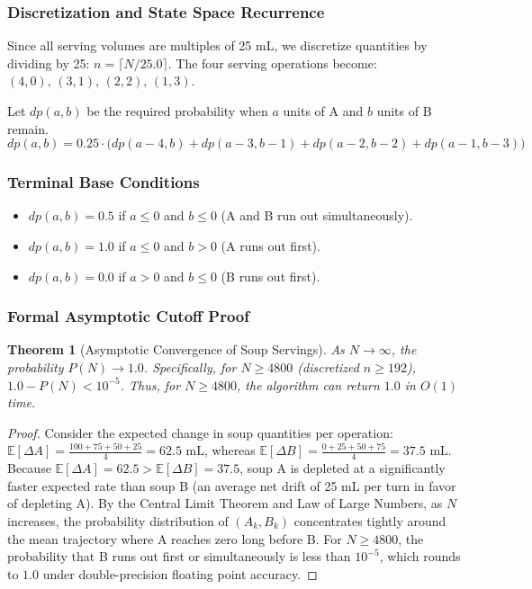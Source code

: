 \documentclass[10pt,journal,compsoc,onecolumn]{IEEEtran}
\newtheorem{theorem}{Theorem}
\begin{document}
\subsubsection{Discretization and State Space Recurrence}
Since all serving volumes are multiples of 25 mL, we discretize quantities by dividing by 25: $n = \lceil N / 25.0 \rceil$. The four serving operations become:
$(4, 0), \, (3, 1), \, (2, 2), \, (1, 3)$.

Let $dp(a, b)$ be the required probability when $a$ units of A and $b$ units of B remain.
\begin{equation}
dp(a, b) = 0.25 \cdot \Big( dp(a-4, b) + dp(a-3, b-1) + dp(a-2, b-2) + dp(a-1, b-3) \Big)
\label{eq:soup-rec}
\end{equation}

\subsubsection{Terminal Base Conditions}
\begin{itemize}
    \item $dp(a, b) = 0.5$ if $a \le 0$ and $b \le 0$ (A and B run out simultaneously).
    \item $dp(a, b) = 1.0$ if $a \le 0$ and $b > 0$ (A runs out first).
    \item $dp(a, b) = 0.0$ if $a > 0$ and $b \le 0$ (B runs out first).
\end{itemize}

\subsubsection{Formal Asymptotic Cutoff Proof}

\begin{theorem}[Asymptotic Convergence of Soup Servings]
As $N \rightarrow \infty$, the probability $P(N) \rightarrow 1.0$. Specifically, for $N \ge 4800$ (discretized $n \ge 192$), $1.0 - P(N) < 10^{-5}$. Thus, for $N \ge 4800$, the algorithm can return $1.0$ in $O(1)$ time.
\end{theorem}

\begin{proof}
Consider the expected change in soup quantities per operation:
$\mathbb{E}[\Delta A] = \frac{100 + 75 + 50 + 25}{4} = 62.5 \text{ mL}$, whereas $\mathbb{E}[\Delta B] = \frac{0 + 25 + 50 + 75}{4} = 37.5 \text{ mL}$.
Because $\mathbb{E}[\Delta A] = 62.5 > \mathbb{E}[\Delta B] = 37.5$, soup A is depleted at a significantly faster expected rate than soup B (an average net drift of 25 mL per turn in favor of depleting A). By the Central Limit Theorem and Law of Large Numbers, as $N$ increases, the probability distribution of $(A_k, B_k)$ concentrates tightly around the mean trajectory where A reaches zero long before B. For $N \ge 4800$, the probability that B runs out first or simultaneously is less than $10^{-5}$, which rounds to $1.0$ under double-precision floating point accuracy.
\end{proof}
\end{document}
